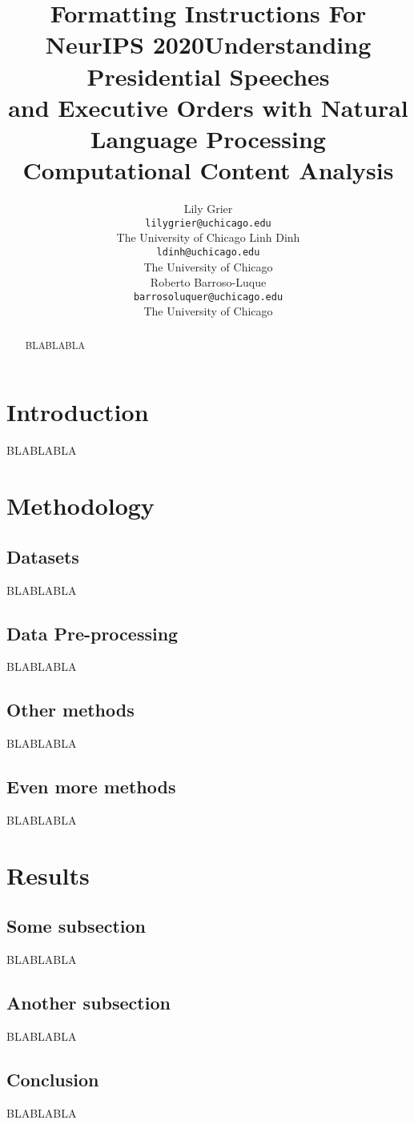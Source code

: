 \documentclass{article}
\title{Formatting Instructions For NeurIPS 2020}
\title{Understanding Presidential Speeches\\ and Executive Orders with Natural Language Processing\\
	\large Computational Content Analysis}
\author{Lily Grier \\
	\texttt{lilygrier@uchicago.edu}  \\
	The University of Chicago
	\AND
	Linh Dinh\\
	\texttt{ldinh@uchicago.edu} \\
    The University of Chicago\\
	\AND
	Roberto Barroso-Luque\\
	\texttt{barrosoluquer@uchicago.edu} \\
	The University of Chicago\\}
\begin{document}
\maketitle

\begin{abstract}{
BLABLABLA }
\end{abstract}

\newpage
\section{Introduction}
BLABLABLA

\section{Methodology}{

\subsection{Datasets}{BLABLABLA}


\subsection{Data Pre-processing}{BLABLABLA}


\subsection{Other methods}{BLABLABLA}


\subsection{Even more methods}{BLABLABLA}


\section{Results}{
\subsection{Some subsection}{BLABLABLA}

\subsection{Another subsection}{BLABLABLA }

\subsection{Conclusion}{BLABLABLA} 
}

}
\end{document}
